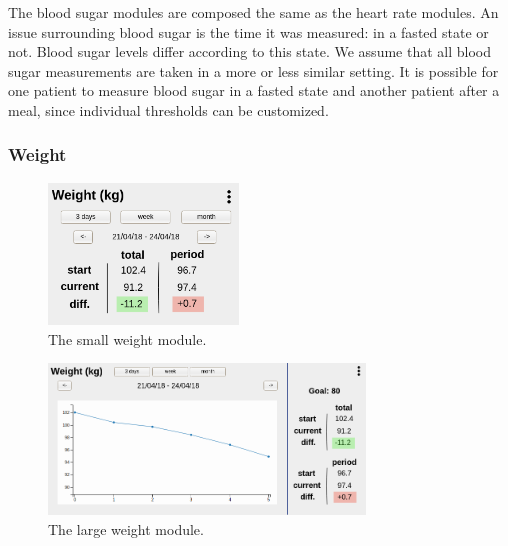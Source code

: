         The blood sugar modules are composed the same as the heart rate modules. An issue surrounding blood sugar is the time it was measured: in a fasted state or not. Blood sugar levels differ according to this state. We assume that all blood sugar measurements are taken in a more or less similar setting. It is possible for one patient to measure blood sugar in a fasted state and another patient after a meal, since individual thresholds can be customized.

        \subsubsection{Weight}

        \begin{figure}[!htb]
            \centering
            \includegraphics[width=0.45\textwidth]{chapters/3_design/mockups/weight_small}
            \caption{The small weight module.}\label{fig:weight_small}
        \end{figure}

        \begin{figure}[!htb]
            \centering
            \includegraphics[width=0.75\textwidth]{chapters/3_design/mockups/weight_large}
            \caption{The large weight module.}\label{fig:weight_large}
        \end{figure}
        
